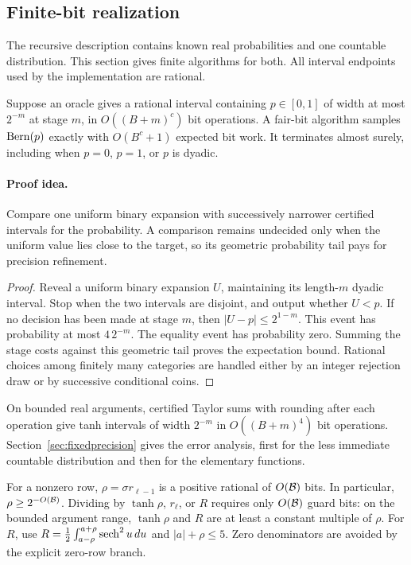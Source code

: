 \subsection{Finite-bit realization}\label{sec:bits}

The recursive description contains known real probabilities and one
countable distribution. This section gives finite algorithms for both.
All interval endpoints used by the implementation are rational.

\begin{lemma}\label{lem:lazy}
Suppose an oracle gives a rational interval containing
\(p\in[0,1]\) of width at most \(2^{-m}\) at stage \(m\), in
\(O((B+m)^c)\) bit operations. A fair-bit algorithm samples
\(\operatorname{Bern}(p)\) exactly with \(O(B^c+1)\) expected bit work.
It terminates almost surely, including when \(p=0\), \(p=1\), or
\(p\) is dyadic.
\end{lemma}
\paragraph{Proof idea.}
Compare one uniform binary expansion with successively narrower certified
intervals for the probability. A comparison remains undecided only when the
uniform value lies close to the target, so its geometric probability tail
pays for precision refinement.

\begin{proof}
Reveal a uniform binary expansion \(U\), maintaining its length-\(m\)
dyadic interval. Stop when the two intervals are disjoint, and output
whether \(U<p\). If no decision has been made at stage \(m\), then
\(|U-p|\le2^{1-m}\). This event has probability at most
\(4\,2^{-m}\). The equality event has probability zero.
Summing the stage costs against this geometric tail proves the
expectation bound. Rational choices among finitely many categories
are handled either by an integer rejection draw or by successive
conditional coins.
\end{proof}

On bounded real arguments, certified Taylor sums with rounding
after each operation give tanh intervals of width \(2^{-m}\)
in \(O((B+m)^4)\) bit operations. Section~\ref{sec:fixedprecision}
gives the error analysis, first for the less immediate countable
distribution and then for the elementary functions.

For a nonzero row, \(\rho=\sigma r_{\ell-1}\) is a positive
rational of \(O(\mathcal B)\) bits. In particular,
\(\rho\ge2^{-O(\mathcal B)}\). Dividing by \(\tanh\rho\), \(r_\ell\),
or \(R\) requires only \(O(\mathcal B)\) guard bits: on the bounded
argument range, \(\tanh\rho\) and \(R\) are at least a constant
multiple of \(\rho\). For \(R\), use
\(R=\frac12\int_{a-\rho}^{a+\rho}\operatorname{sech}^2u\,du\) and
\(|a|+\rho\le5\).
Zero denominators are avoided by the explicit zero-row branch.

